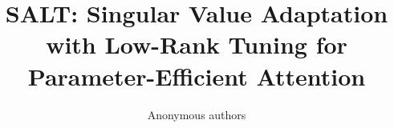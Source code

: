 \title{\textbf{SALT: Singular Value Adaptation with Low-Rank Tuning for Parameter-Efficient Attention}}

\author{Anonymous authors}
